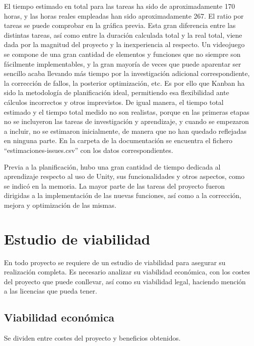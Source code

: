 
El tiempo estimado en total para las tareas ha sido de aproximadamente 170 horas, y las horas reales empleadas han sido aproximadamente 267. El ratio por tareas se puede comprobar en la gráfica previa. Esta gran diferencia entre las distintas tareas, así como entre la duración calculada total y la real total, viene dada por la magnitud del proyecto y la inexperiencia al respecto. Un videojuego se compone de una gran cantidad de elementos y funciones que no siempre son fácilmente implementables, y la gran mayoría de veces que puede aparentar ser sencillo acaba llevando más tiempo por la investigación adicional correspondiente, la corrección de fallos, la posterior optimización, etc. Es por ello que Kanban ha sido la metodología de planificación ideal, permitiendo esa flexibilidad ante cálculos incorrectos y otros imprevistos. De igual manera, el tiempo total estimado y el tiempo total medido no son realistas, porque en las primeras etapas no se incluyeron las tareas de investigación y aprendizaje, y cuando se empezaron a incluir, no se estimaron inicialmente, de manera que no han quedado reflejadas en ninguna parte. En la carpeta de la documentación se encuentra el fichero ``estimaciones-issues.csv'' con los datos correspondientes.

Previa a la planificación, hubo una gran cantidad de tiempo dedicada al aprendizaje respecto al uso de Unity, sus funcionalidades y otros aspectos, como se indicó en la memoria. La mayor parte de las tareas del proyecto fueron dirigidas a la implementación de las nuevas funciones, así como a la corrección, mejora y optimización de las mismas.

\section{Estudio de viabilidad}

En todo proyecto se requiere de un estudio de viabilidad para asegurar su realización completa. Es necesario analizar su viabilidad económica, con los costes del proyecto que puede conllevar, así como su viabilidad legal, haciendo mención a las licencias que pueda tener.

\subsection{Viabilidad económica}

Se dividen entre costes del proyecto y beneficios obtenidos.

